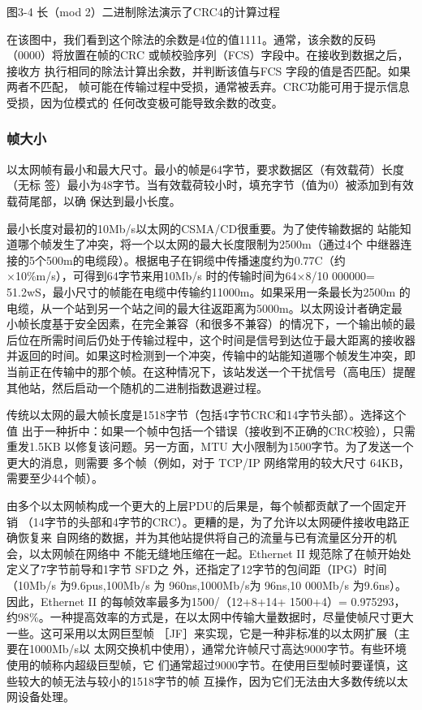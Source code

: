图3-4 长（mod 2）二进制除法演示了CRC4的计算过程

在该图中，我们看到这个除法的余数是4位的值1111。通常，该余数的反码
（0000）将放置在帧的CRC 或帧校验序列（FCS）字段中。在接收到数据之后，接收方
执行相同的除法计算出余数，并判断该值与FCS 字段的值是否匹配。如果两者不匹配，
帧可能在传输过程中受损，通常被丢弃。CRC功能可用于提示信息受损，因为位模式的
任何改变极可能导致余数的改变。

\subsubsection{帧大小}

以太网帧有最小和最大尺寸。最小的帧是64字节，要求数据区（有效载荷）长度（无标
签）最小为48字节。当有效载荷较小时，填充字节（值为0）被添加到有效载荷尾部，以确
保达到最小长度。

\begin{tcolorbox}
    最小长度对最初的10Mb/s以太网的CSMA/CD很重要。为了使传输数据的
    站能知道哪个帧发生了冲突，将一个以太网的最大长度限制为2500m（通过4个
    中继器连接的5个500m的电缆段）。根据电子在铜缆中传播速度约为0.77C（约
    ×10\%m/s），可得到64字节来用10Mb/s 时的传输时间为64×8/10 000000=
    51.2wS，最小尺寸的帧能在电缆中传输约11000m。如果采用一条最长为2500m
    的电缆，从一个站到另一个站之间的最大往返距离为5000m。以太网设计者确定最
    小帧长度基于安全因素，在完全兼容（和很多不兼容）的情况下，一个输出帧的最
    后位在所需时间后仍处于传输过程中，这个时间是信号到达位于最大距离的接收器
    并返回的时间。如果这时检测到一个冲突，传输中的站能知道哪个帧发生冲突，即
    当前正在传输中的那个帧。在这种情况下，该站发送一个干扰信号（高电压）提醒
    其他站，然后启动一个随机的二进制指数退避过程。
\end{tcolorbox}

传统以太网的最大帧长度是1518字节（包括4字节CRC和14字节头部）。选择这个值
出于一种折中：如果一个帧中包括一个错误（接收到不正确的CRC校验），只需重发1.5KB
以修复该问题。另一方面，MTU 大小限制为1500字节。为了发送一个更大的消息，则需要
多个帧（例如，对于 TCP/IP 网络常用的较大尺寸 64KB，需要至少44个帧）。

由多个以太网帧构成一个更大的上层PDU的后果是，每个帧都贡献了一个固定开销
（14字节的头部和4字节的CRC）。更糟的是，为了允许以太网硬件接收电路正确恢复来
自网络的数据，并为其他站提供将自己的流量与已有流量区分开的机会，以太网帧在网络中
不能无缝地压缩在一起。Ethernet II 规范除了在帧开始处定义了7字节前导和1字节 SFD之
外，还指定了12字节的包间距（IPG）时间（10Mb/s 为9.6pus,100Mb/s 为 960ns,1000Mb/s为
96ns,10 000Mb/s 为9.6ns）。因此，Ethernet II 的每帧效率最多为1500/（12+8+14+ 1500+4）=
0.975293，约98\%。一种提高效率的方式是，在以太网中传输大量数据时，尽量使帧尺寸更大
一些。这可采用以太网巨型帧 ［JF］来实现，它是一种非标准的以太网扩展（主要在1000Mb/s以
太网交换机中使用），通常允许帧尺寸高达9000字节。有些环境使用的帧称内超级巨型帧，它
们通常超过9000字节。在使用巨型帧时要谨慎，这些较大的帧无法与较小的1518字节的帧
互操作，因为它们无法由大多数传统以太网设备处理。

